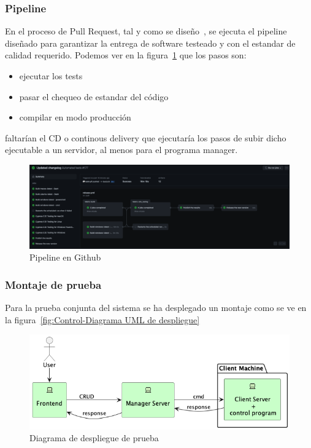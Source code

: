 
\subsubsection{Pipeline}

En el proceso de Pull Request, tal y como se diseño~, se ejecuta el pipeline diseñado para garantizar la entrega de software testeado y con el estandar de calidad requerido.
Podemos ver en la figura~\cref{fig:githubActions} que los pasos son:

\begin{itemize}
    \item ejecutar los tests
    \item pasar el chequeo de estandar del código
    \item compilar en modo producción
\end{itemize}

faltarían el CD o continous delivery que ejecutaría los pasos de subir dicho ejecutable a un servidor, al menos para el programa manager.

\begin{figure}[H]
    \centering
    \includegraphics[height=0.2\textheight]{./part/Ejecucion/Seguimiento/PuestaAPunto/img/githubPipelines}
    \caption{Pipeline en Github}\label{fig:githubActions}
\end{figure}

\subsubsection{Montaje de prueba}

Para la prueba conjunta del sistema se ha desplegado un montaje como se ve en la figura~\cref{fig:Control-Diagrama UML de despliegue}

\begin{figure}[H]
    \centering
    \includegraphics[height=0.2\textheight]{./part/Ejecucion/Seguimiento/PuestaAPunto/img/deploy}
    \caption{Diagrama de despliegue de prueba}\label{fig:despliegue de prueba}
\end{figure}

